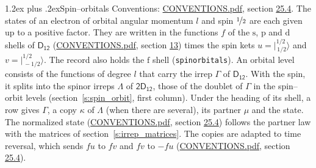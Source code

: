 \documentclass[10pt,a4paper]{article}
\makeatletter
\renewcommand\section{\@startsection{section}{1}{\z@}{-3ex plus -1ex minus -.2ex}%
  {1.2ex plus .2ex}{\normalfont\large\sffamily\bfseries\color{parttitle}}}
\numberwithin{equation}{section}
\newcommand{\grp}[1]{\mathsf{#1}}
\newcommand{\orbital}[1]{\mathrm{#1}}
\newcommand{\mult}{\kappa}
\newcommand{\intx}{\mu}
\newcommand{\jm}[2]{\bigl\lvert{}^{#1}_{\,#2}\bigr\rangle}
\makeatother
\begin{document}
\section{Spin--orbitals}\label{s:spin_orbitals}
Conventions: \href{../../CONVENTIONS.pdf}{CONVENTIONS.pdf}, section \href{../../CONVENTIONS.pdf\#conv.25.4}{25.4}.
\leavevmode\label{n:index.orbital.l}The states of an electron of orbital angular momentum $l$ and spin $\nicefrac{1}{2}$ are each given up to a positive factor. \label{n:local.spinor.uv}\label{n:local.function.f}They are written in the functions $f$ of the $\orbital{s}$, $\orbital{p}$ and $\orbital{d}$ shells of \href{../../../rotation/data/pdf/D12.pdf}{$\grp{D_{12}}$} (\href{../../CONVENTIONS.pdf}{CONVENTIONS.pdf}, section \href{../../../rotation/CONVENTIONS.pdf\#conv.13}{13}) times the spin kets $u = \jm{1/2}{1/2}$ and $v = \jm{1/2}{-1/2}$. The record also holds the $\orbital{f}$ shell (\texttt{spinorbitals}). An orbital level consists of the functions of degree $l$ that carry the irrep $\Gamma$ of \href{../../../rotation/data/pdf/D12.pdf}{$\grp{D_{12}}$}. With the spin, it splits into the spinor irreps $\Lambda$ of $\grp{2D_{12}}$, those of the doublet of $\Gamma$ in the spin--orbit levels (section~\ref{s:spin_orbit}, first column). \label{n:head.state}Under the heading of its shell, a row gives $\Gamma$, a copy $\mult$ of $\Lambda$ (when there are several), its partner $\intx$ and the state. The normalized state (\href{../../CONVENTIONS.pdf}{CONVENTIONS.pdf}, section \href{../../CONVENTIONS.pdf\#conv.25.4}{25.4}) follows the partner law with the matrices of section~\ref{s:irrep_matrices}. The copies are adapted to time reversal, which sends $f u$ to $f v$ and $f v$ to $-f u$ (\href{../../CONVENTIONS.pdf}{CONVENTIONS.pdf}, section \href{../../CONVENTIONS.pdf\#conv.25.4}{25.4}).
\end{document}
